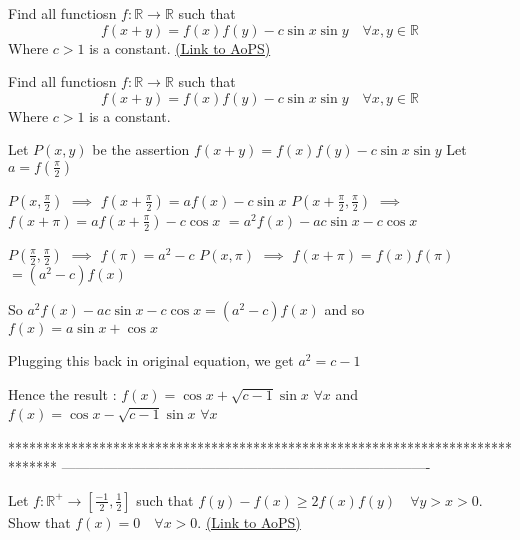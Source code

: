 \begin{problem}
	Find all functiosn $f:\mathbb{R}\to \mathbb{R}$ such that  \[f\left( x+y \right)=f\left( x \right)f\left( y \right)-c\sin x\sin y \quad \forall x,y\in\mathbb R\] Where $c>1$ is a constant.
	\flushright \href{https://artofproblemsolving.com/community/c6h566424}{(Link to AoPS)}
\end{problem}



\begin{solution}
	\begin{tcolorbox}Find all functiosn $f:\mathbb{R}\to \mathbb{R}$ such that  \[f\left( x+y \right)=f\left( x \right)f\left( y \right)-c\sin x\sin y \quad \forall x,y\in\mathbb R\] Where $c>1$ is a constant.\end{tcolorbox}
Let $P(x,y)$ be the assertion $f(x+y)=f(x)f(y)-c\sin x\sin y$
Let $a=f(\frac{\pi}2)$

$P(x,\frac{\pi}2)$ $\implies$ $f(x+\frac{\pi}2)=af(x)-c\sin x$
$P(x+\frac{\pi}2,\frac{\pi}2)$ $\implies$ $f(x+\pi)=af(x+\frac{\pi}2)-c\cos x$ $=a^2f(x)-ac\sin x-c\cos x$

$P(\frac{\pi}2,\frac{\pi}2)$ $\implies$ $f(\pi)=a^2-c$
$P(x,\pi)$ $\implies$ $f(x+\pi)=f(x)f(\pi)$ $=(a^2-c)f(x)$

So $a^2f(x)-ac\sin x-c\cos x=(a^2-c)f(x)$ and so  $f(x)=a\sin x+\cos x$ 

Plugging this back in original equation, we get $a^2=c-1$

Hence the result : $\boxed{f(x)=\cos x+\sqrt{c-1}\sin x}$ $\forall x$ and $\boxed{f(x)=\cos x-\sqrt{c-1}\sin x}$ $\forall x$
\end{solution}
*******************************************************************************
-------------------------------------------------------------------------------

\begin{problem}
	Let $f: \mathbb {R}^{+} \to  \left[\frac{-1}{ 2}, \frac{1}{2}\right ]$ such that $f (y) - f (x)\geq  2f (x)f (y) \quad \forall y> x> 0$. Show that $f (x) = 0 \quad \forall x> 0$.
	\flushright \href{https://artofproblemsolving.com/community/c6h566432}{(Link to AoPS)}
\end{problem}



